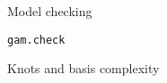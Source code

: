 
\begin{block}{Model checking}
  \begin{subblock}{\texttt{gam.check}}
  \end{subblock}
  \begin{subblock}{Knots and basis complexity}
  \end{subblock}
\end{block}

